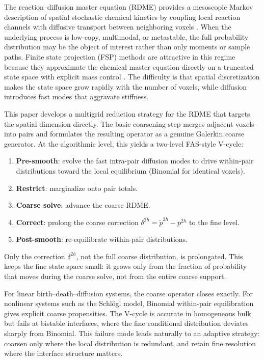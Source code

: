 \documentclass[11pt]{article}
\begin{document}
The reaction--diffusion master equation (RDME) provides a mesoscopic Markov
description of spatial stochastic chemical kinetics by coupling local reaction
channels with diffusive transport between neighboring voxels
\citep{Gillespie1977,Erban2009}. When the underlying process is low-copy,
multimodal, or metastable, the full probability distribution may be the object
of interest rather than only moments or sample paths. Finite state projection
(FSP) methods are attractive in this regime because they approximate the
chemical master equation directly on a truncated state space with explicit mass
control \citep{Munsky2006}. The difficulty is that spatial discretization makes
the state space grow rapidly with the number of voxels, while diffusion
introduces fast modes that aggravate stiffness.

This paper develops a multigrid reduction strategy for the RDME that targets
the spatial dimension directly. The basic coarsening step merges adjacent
voxels into pairs and formulates the resulting operator as a genuine
Galerkin coarse generator. At the algorithmic level, this yields a two-level
FAS-style V-cycle:
\begin{enumerate}[itemsep=0.2em]
  \item \textbf{Pre-smooth}: evolve the fast intra-pair diffusion modes to drive
    within-pair distributions toward the local equilibrium (Binomial for
    identical voxels).
  \item \textbf{Restrict}: marginalize onto pair totals.
  \item \textbf{Coarse solve}: advance the coarse RDME.
  \item \textbf{Correct}: prolong the coarse correction
    $\delta^{2h} = \tilde p^{2h} - p^{2h}$ to the fine level.
  \item \textbf{Post-smooth}: re-equilibrate within-pair distributions.
\end{enumerate}
Only the correction $\delta^{2h}$, not the full coarse distribution, is
prolongated. This keeps the fine state space small: it grows only from the
fraction of probability that moves during the coarse solve, not from the entire
coarse support.

For linear birth--death--diffusion systems, the coarse operator closes exactly.
For nonlinear systems such as the Schl\"ogl model, Binomial within-pair
equilibration gives explicit coarse propensities. The V-cycle is accurate in
homogeneous bulk but fails at bistable interfaces, where the fine conditional
distribution deviates sharply from Binomial. This failure mode leads naturally
to an adaptive strategy: coarsen only where the local distribution is
redundant, and retain fine resolution where the interface structure matters.
\end{document}
